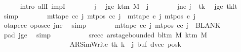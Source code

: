 \begin{isabellebody}
\ \ \ \ \isamarkupfalse%
\ {\isacharparenleft}{\kern0pt}intro\ allI\ impI{\isacharparenright}{\kern0pt}\isanewline
\ \ \ \ \ \ \isamarkupfalse%
\ j{\isacharprime}{\kern0pt}\ \isamarkupfalse%
\ jge{\isacharcolon}{\kern0pt}\ {\isachardoublequoteopen}k{\isacharunderscore}{\kern0pt}tm\ M\ {\isasymle}\ j{\isacharprime}{\kern0pt}{\isachardoublequoteclose}\isanewline
\ \ \ \ \ \ \isamarkupfalse%
\ jne{\isacharcolon}{\kern0pt}\ {\isachardoublequoteopen}j{\isacharprime}{\kern0pt}\ {\isasymnoteq}\ tk{\isachardoublequoteclose}\ \isamarkupfalse%
\ jge\ tk{\isacharunderscore}{\kern0pt}lt\ \isamarkupfalse%
\ simp\isanewline
\ \ \ \ \ \ \isamarkupfalse%
\ {\isachardoublequoteopen}mt{\isacharunderscore}{\kern0pt}tape\ cc\ j{\isacharprime}{\kern0pt}\ {\isacharparenleft}{\kern0pt}mt{\isacharunderscore}{\kern0pt}pos\ cc\ j{\isacharprime}{\kern0pt}{\isacharparenright}{\kern0pt}\ {\isacharequal}{\kern0pt}\ mt{\isacharunderscore}{\kern0pt}tape\ c{}\ j{\isacharprime}{\kern0pt}\ {\isacharparenleft}{\kern0pt}mt{\isacharunderscore}{\kern0pt}pos\ c{}\ j{\isacharprime}{\kern0pt}{\isacharparenright}{\kern0pt}{\isachardoublequoteclose}\isanewline
\ \ \ \ \ \ \ \ \isamarkupfalse%
\ otape{\isacharunderscore}{\kern0pt}cc\ opos{\isacharunderscore}{\kern0pt}cc\ jne\ \isamarkupfalse%
\ simp\isanewline
\ \ \ \ \ \ \isamarkupfalse%
\ {\isachardoublequoteopen}mt{\isacharunderscore}{\kern0pt}tape\ cc\ j{\isacharprime}{\kern0pt}\ {\isacharparenleft}{\kern0pt}mt{\isacharunderscore}{\kern0pt}pos\ cc\ j{\isacharprime}{\kern0pt}{\isacharparenright}{\kern0pt}\ {\isacharequal}{\kern0pt}\ BLANK{}{\isachardoublequoteclose}\ \isamarkupfalse%
\ pad{}\ jge\ \isamarkupfalse%
\ simp\isanewline
\ \ \ \ \isamarkupfalse%
\isanewline
\ \ \ \ \isamarkupfalse%
\ src{\isacharunderscore}{\kern0pt}cc{\isacharcolon}{\kern0pt}\ {\isachardoublequoteopen}ar{\isacharunderscore}{\kern0pt}stage{\isacharunderscore}{\kern0pt}bounded\ {\isacharparenleft}{\kern0pt}bl{\isacharunderscore}{\kern0pt}tm\ M{\isacharparenright}{\kern0pt}\ {\isacharparenleft}{\kern0pt}k{\isacharunderscore}{\kern0pt}tm\ M{\isacharparenright}{\kern0pt}\isanewline
\ \ \ \ \ \ \ \ \ \ \ \ \ \ \ \ \ \ \ \ {\isacharparenleft}{\kern0pt}AR{\isacharunderscore}{\kern0pt}SimWrite{\isacharcomma}{\kern0pt}\ tk{\isacharcomma}{\kern0pt}\ {\isacharquery}{\kern0pt}k\ {\isacharplus}{\kern0pt}\ j{\isacharcomma}{\kern0pt}\ buf{\isacharcomma}{\kern0pt}\ dvec{\isacharcomma}{\kern0pt}\ posk{\isacharparenright}{\kern0pt}{\isachardoublequoteclose}\isanewline

\end{isabellebody}
